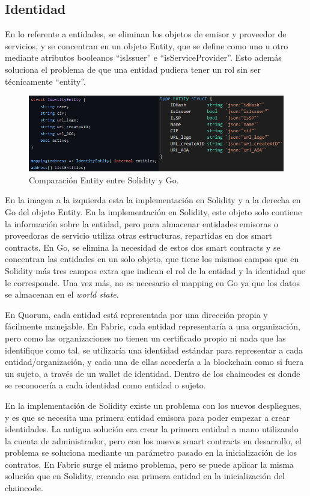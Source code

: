 \subsection{Identidad}
En lo referente a entidades, se eliminan los objetos de emisor y proveedor de servicios, y se concentran en un objeto Entity, que se define como uno u otro mediante atributos booleanos ``isIssuer'' e ``isServiceProvider''. Esto además soluciona el problema de que una entidad pudiera tener un rol sin ser técnicamente ``entity''.
\begin{figure}[H]
\centerline{\includegraphics[scale=0.8]{recursos/entities.png}}
\caption{Comparación Entity entre Solidity y Go.}
\label{entities-comp}
\end{figure}
En la imagen a la izquierda esta la implementación en Solidity y a la derecha en Go del objeto Entity. En la implementación en Solidity, este objeto solo contiene la información sobre la entidad, pero para almacenar entidades emisoras o proveedoras de servicio utiliza otras estructuras, repartidas en dos smart contracts. En Go, se elimina la necesidad de estos dos smart contracts y se concentran las entidades en un solo objeto, que tiene los mismos campos que en Solidity más tres campos extra que indican el rol de la entidad y la identidad que le corresponde. Una vez más, no es necesario el mapping en Go ya que los datos se almacenan en el \textit{world state}.

En Quorum, cada entidad está representada por una dirección propia y fácilmente manejable. En Fabric, cada entidad representaría a una organización, pero como las organizaciones no tienen un certificado propio ni nada que las identifique como tal, se utilizaría una identidad estándar para representar a cada entidad/organización, y cada una de ellas accedería a la blockchain como si fuera un sujeto, a través de un wallet de identidad. Dentro de los chaincodes es donde se reconocería a cada identidad como entidad o sujeto. 

En la implementación de Solidity existe un problema con los nuevos despliegues, y es que se necesita una primera entidad emisora para poder empezar a crear identidades. La antigua solución era crear la primera entidad a mano utilizando la cuenta de administrador, pero con los nuevos smart contracts en desarrollo, el problema se soluciona mediante un parámetro pasado en la inicialización de los contratos. En Fabric surge el mismo problema, pero se puede aplicar la misma solución que en Solidity, creando esa primera entidad en la inicialización del chaincode.

